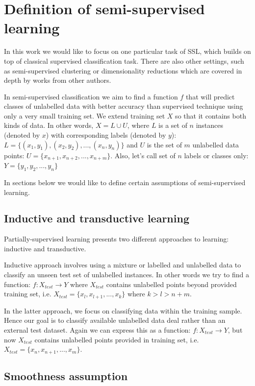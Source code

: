 \documentclass[12pt, a4paper, pdflatex]{report}
\begin{document}
\section{Definition of semi-supervised learning}
In this work we would like to focus on one particular task of SSL, which builds on top of classical supervised classification task. There are also other settings, such as semi-supervised clustering or dimensionality reductions which are covered in depth by works from other authors.

In semi-supervised classification we aim to find a function $ f $ that will predict classes of unlabelled data with better accuracy than supervised technique using only a very small training set. We extend training set $ X $ so that it contains both kinds of data. In other words, $ X = L \cup U $, where $ L $ is a set of $ n $ instances (denoted by $ x $) with corresponding labels (denoted by $ y $): $ L = \{ (x_1, y_1), (x_2, y_2), ..., (x_n, y_n)\} $ and $ U $ is the set of $ m $ unlabelled data points: $ U = \{ x_{n+1}, x_{n+2}, ..., x_{n+m}\} $. Also, let's call set of $n$ labels or classes only: $ Y = \{ y_1, y_2, ..., y_n \} $

In sections below we would like to define certain assumptions of semi-supervised learning.

\subsection{Inductive and transductive learning}
Partially-supervised learning presents two different approaches to learning: inductive and transductive\cite{chapelle06}. 

Inductive approach involves using a mixture or labelled and unlabelled data to classify an unseen test set of unlabelled instances. In other words we try to find a function: $ f: X_{test} \to Y $ where $ X_{test} $ contains unlabelled points beyond provided training set, i.e. $ X_{test} = \{ x_l, x_{l+1}, ..., x_{k} \} $ where $ k > l > n+m $.

In the latter approach, we focus on classifying data within the training sample. Hence our goal is to classify available unlabelled data deal rather than an external test dataset. Again we can express this as a function: $ f: X_{test} \to Y $, but now $ X_{test} $ contains unlabelled points provided in training set, i.e. $ X_{test} = \{ x_n, x_{n+1}, ..., x_{m} \} $.

\subsection{Smoothness assumption}
\end{document}
